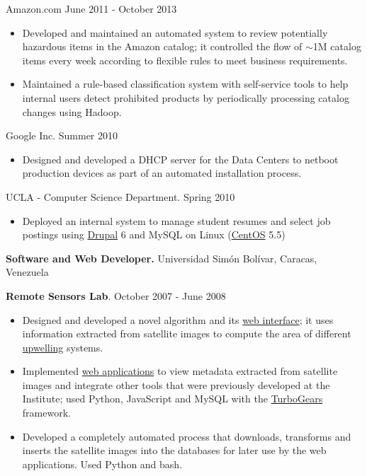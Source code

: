 \documentclass[10pt]{article}
\newcommand{\vitem}{\vspace*{-.4pc}\item}
\begin{document}
 Amazon.com \hfill June 2011 - October 2013
\begin{itemize}
  \vitem Developed and maintained an automated system to review
  potentially hazardous items in the Amazon catalog; it controlled the
  flow of $\sim$1M catalog items every week according to flexible rules to
  meet business requirements.
  \vitem Maintained a rule-based classification system with
  self-service tools to help internal users detect prohibited products
  by periodically processing catalog changes using Hadoop.
\end{itemize}

 Google Inc. \hfill Summer 2010
\begin{itemize}
  \vitem Designed and developed a DHCP server for the Data Centers to
  netboot production devices as part of an automated installation
  process.
\end{itemize}

 UCLA - Computer Science
Department. \hfill Spring 2010
\begin{itemize}
  \vitem Deployed an internal system to manage student resumes and select job postings using \href{http://drupal.org/}{Drupal} 6 and MySQL on Linux (\href{http://www.centos.org/}{CentOS} 5.5)
\end{itemize}


\flushleft\textbf{Software and Web Developer.} Universidad Simón Bolívar, Caracas, Venezuela

\textbf{Remote Sensors Lab}. \hfill October 2007 - June 2008
\begin{itemize}
  \vitem Designed and developed a novel algorithm and its
  \href{http://ood.cbm.usb.ve/surgencia/sst_modis/mostrar_imagen?img=66}{web
    interface}; it uses information extracted from satellite images to
  compute the area of different
  \href{http://en.wikipedia.org/wiki/Upwelling}{upwelling} systems.

  \vitem Implemented
  \href{http://ood.intecmar.usb.ve/surgencia/sst_modis/}{web
    applications} to view metadata extracted from satellite images and
  integrate other tools that were previously developed at the
  Institute; used Python, JavaScript and MySQL with the
  \href{http://turbogears.org/}{TurboGears} framework.

\vitem Developed a completely automated process that
  downloads, transforms and inserts the satellite images into the
  databases for later use by the web applications. Used Python and bash.
\end{itemize}
\end{document}
